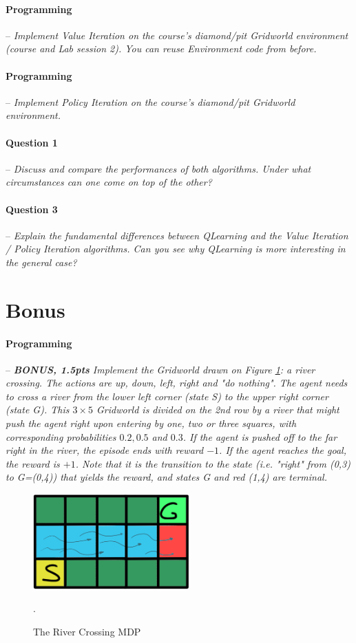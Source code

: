 \documentclass[a4paper]{article}
\newcommand{\question}[2]{
\paragraph{Question #1} -- \textit{#2}

}
\newcommand{\programming}[1]{
\paragraph{Programming} -- \textit{#1}

}
\begin{document}
\programming{Implement Value Iteration on the course's diamond/pit Gridworld environment (course and Lab session 2). You can reuse Environment code from before.}

\programming{Implement Policy Iteration on the course's diamond/pit Gridworld environment.}

\question{1}{Discuss and compare the performances of both algorithms. Under what circumstances can one come on top of the other?}

\question{3}{Explain the fundamental differences between QLearning and the Value Iteration / Policy Iteration algorithms. Can you see why QLearning is more interesting in the general case?}

\section{Bonus}
\programming{\textbf{BONUS, 1.5pts} Implement the Gridworld drawn on Figure \ref{fig:river_crossing}: a river crossing. The actions are up, down, left, right and "do nothing". The agent needs to cross a river from the lower left corner (state S) to the upper right corner (state G). This $3\times 5$ Gridworld is divided on the 2nd row by a river that might push the agent right upon entering by one, two or three squares, with corresponding probabilities $0.2, 0.5$ and $0.3$. If the agent is pushed off to the far right in the river, the episode ends with reward $-1$. If the agent reaches the goal, the reward is $+1$. Note that it is the transition to the state (i.e. "right" from (0,3) to G=(0,4)) that yields the reward, and states G and red (1,4) are terminal. }

\begin{figure}[H]
    \centering
    \includegraphics[width=6cm]{plots/river.png}
    \caption{The River Crossing MDP}.
    \label{fig:river_crossing}
\end{figure}{}


\printbibliography
\end{document}
